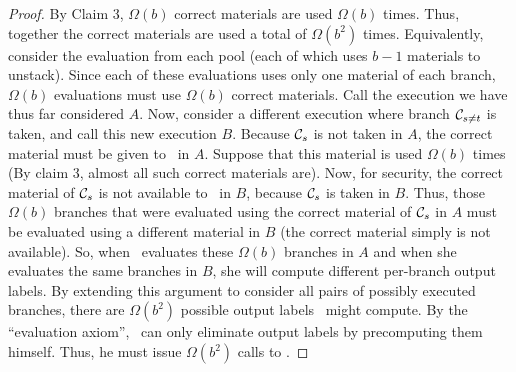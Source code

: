 \begin{proof}
By Claim 3, $\Omega(b)$ correct
materials are used $\Omega(b)$ times. Thus, together the correct materials are used a
total of $\Omega(b^2)$ times. Equivalently, consider the evaluation
from each pool (each of which uses $b-1$ materials to unstack). Since each of these
evaluations uses only one material of each branch, $\Omega(b)$ evaluations
must use $\Omega(b)$ correct materials.  Call the execution we have thus far
considered $A$.
Now, consider a different execution where branch
$\mathcal C_{s\neq t}$  is taken, and call this new execution $B$. Because
$\mathcal C_s$ is
not taken in $A$, the correct material must be given to \Eval\ in $A$. Suppose
that this material is used $\Omega(b)$ times (By claim 3, almost all such
correct materials are). Now, for security, the correct material of $\mathcal C_s$ is
not available to \Eval\ in $B$, because $\mathcal C_s$ is taken in $B$. Thus, those
$\Omega(b)$ branches that were evaluated using the correct material of
$\mathcal C_s$
in $A$
must be evaluated using a different material in $B$ (the correct
material
simply is not available). So, when \Eval\ evaluates these $\Omega(b)$ branches
in $A$ and when she evaluates the same branches in $B$, she will compute
different per-branch output labels. By extending this argument to
consider all pairs of possibly executed branches, there are $\Omega(b^2)$
possible output labels \Eval\ might compute. By the “evaluation axiom”,
\Gen\ can only eliminate output labels by precomputing them himself.
Thus, he must issue $\Omega(b^2)$ calls to \Ev.
\end{proof}



